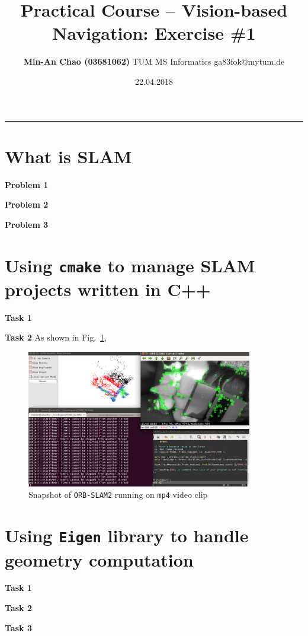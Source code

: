 \documentclass[12pt,a4paper]{article}
\makeatletter
\newcommand{\docTitle}{Practical Course -- Vision-based Navigation: Exercise \#1}
\newcommand{\docAuthor}{Min-An Chao (03681062)}
\newcommand{\docAuthorDept}{TUM MS Informatics}
\newcommand{\docAuthorEmail}{ga83fok@mytum.de}
\newcommand{\docDate}{22.04.2018}
\makeatother
\begin{document}
    \title{\vspace{-1.75cm} \large \textsf{\textbf{\docTitle}}}
    \author{\normalsize \textsf{
        \textbf{\docAuthor} \hspace{6pt}\textbar\hspace{6pt}
        \docAuthorDept \hspace{6pt}\textbar\hspace{6pt}
        \docAuthorEmail}}
    \date{\small \textsf{\docDate}}
    \maketitle 
    \thispagestyle{fancy}
    \vspace{-0.5cm}
    \hrule

    \section{What is SLAM}
   
    \textsf{\textbf{Problem 1}}
    
    \textsf{\textbf{Problem 2}}
    
    \textsf{\textbf{Problem 3}}

    \section{Using \texttt{cmake} to manage SLAM projects written in C++}
    \textsf{\textbf{Task 1}}


    \textsf{\textbf{Task 2}}
    As shown in Fig.~\ref{fig:orbslam_snapshot},

    \begin{figure}[!h]
        \centering
        \includegraphics[height=6cm]{fig/orbslam_snapshot.png}
        \caption{Snapshot of \texttt{ORB-SLAM2} running on \texttt{mp4} video clip}
        \label{fig:orbslam_snapshot}
    \end{figure}
    
    \section{Using \texttt{Eigen} library to handle geometry computation}
    \textsf{\textbf{Task 1}}

    \textsf{\textbf{Task 2}}
    
    \textsf{\textbf{Task 3}}
    
    
\end{document}
